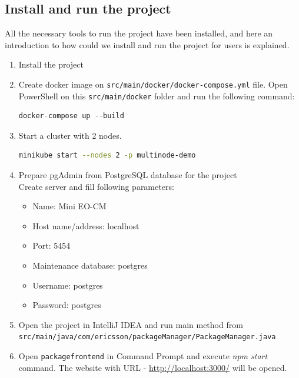 \subsection{Install and run the project}
All the necessary tools to run the project have been installed, and here an introduction to how could we install and run the project for users is explained.

\begin{enumerate}
  \item Install the project~\cite{mini-eo-cm}
  
  \item Create docker image on \texttt{src/main/docker/docker-compose.yml} file. Open PowerShell on this \texttt{src/main/docker} folder and run the following command:
    \begin{lstlisting}[language={Java}]
    docker-compose up --build
    \end{lstlisting}
  
    \item Start a cluster with 2 nodes.
    \begin{lstlisting}[language={Bash}]
    minikube start --nodes 2 -p multinode-demo
    \end{lstlisting}
  
  \item Prepare pgAdmin from PostgreSQL database for the project\\
      Create server and fill following parameters:
      \begin{itemize}
      \item Name: Mini EO-CM
      \item Host name/address: localhost
      \item Port: 5454
      \item Maintenance database: postgres
      \item Username: postgres
      \item Password: postgres
    \end{itemize}
    
  \item Open the project in IntelliJ IDEA and run main method from \texttt{src/main/java/com/ericsson/packageManager/PackageManager.java}
  
  \item Open \texttt{packagefrontend} in Command Prompt and execute \textit{npm start} command. The website with URL - \url{http://localhost:3000/} will be opened.
  
\end{enumerate}

